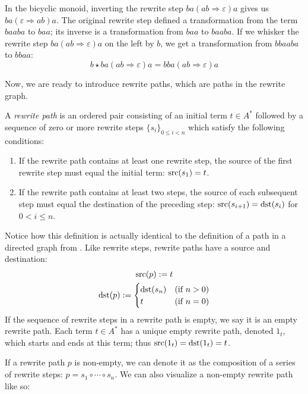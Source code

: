 \documentclass[../generics]{subfiles}
\begin{document}
\begin{example}
In the bicyclic monoid, inverting the rewrite step $ba(ab\Rightarrow\varepsilon)a$ gives us $ba(\varepsilon\Rightarrow ab)a$. The original rewrite step defined a transformation from the term $baaba$ to $baa$; its inverse is a transformation from $baa$ to $baaba$. If we whisker the rewrite step $ba(ab\Rightarrow\varepsilon)a$ on the left by $b$, we get a transformation from $bbaaba$ to $bbaa$:
\[b\star ba(ab\Rightarrow\varepsilon)a=bba(ab\Rightarrow\varepsilon)a\]

Now, we are ready to introduce rewrite paths, which are paths in the rewrite graph. 
\end{example}
\begin{definition}
%
A \emph{rewrite path} is an ordered pair consisting of an initial term $t\in A^*$ followed by a sequence of zero or more rewrite steps $\{s_i\}_{0\leq i<n}$ which satisfy the following conditions:
\begin{enumerate}
\item If the rewrite path contains at least one rewrite step, the source of the first rewrite step must equal the initial term: $\operatorname{src}(s_1)=t$.
\item If the rewrite path contains at least two steps, the source of each subsequent step must equal the destination of the preceding step: $\operatorname{src}(s_{i+1})=\operatorname{dst}(s_i)$ for $0<i\leq n$.
\end{enumerate}
Notice how this definition is actually identical to the definition of a path in a directed graph from . Like rewrite steps, rewrite paths have a source and destination:
\begin{gather*}
\operatorname{src}(p):=t\\
\operatorname{dst}(p):=\begin{cases}
\operatorname{dst}(s_n)&\text{(if $n>0$)}\\
t&\text{(if $n=0$)}
\end{cases}
\end{gather*}
If the sequence of rewrite steps in a rewrite path is empty, we say it is an empty rewrite path. Each term $t\in A^*$ has a unique empty rewrite path, denoted $1_t$, which starts and ends at this term; thus $\operatorname{src}(1_t)=\operatorname{dst}(1_t)=t$.

If a rewrite path $p$ is non-empty, we can denote it as the composition of a series of rewrite steps: $p=s_1\circ\cdots\circ s_n$. We can also visualize a non-empty rewrite path like so:
\begin{quote}
\end{quote}

\end{definition}
\end{document}
